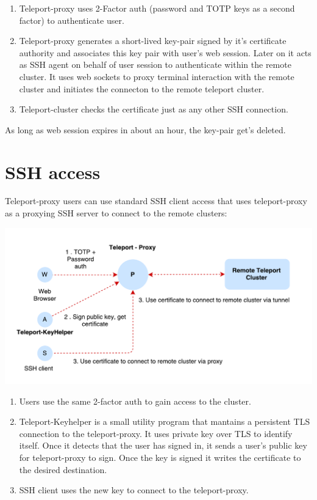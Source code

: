 \documentclass{res}
\begin{document}
\begin{resume}
    \begin{enumerate} %
      \item Teleport-proxy uses 2-Factor auth (password and TOTP keys as a second factor) to authenticate user.
      \item Teleport-proxy generates a short-lived key-pair signed by it's certificate authority and associates this key pair with user's web session. Later on it acts as SSH agent on behalf of user session to authenticate within the remote cluster. It uses web sockets to proxy terminal interaction with the remote cluster and initiates the connecton to the remote teleport cluster.
      \item Teleport-cluster checks the certificate just as any other SSH connection.
    \end{enumerate}

    As long as web session expires in about an hour, the key-pair get's deleted.

\section{SSH access}
\vspace{0.1in}

    Teleport-proxy users can use standard SSH client access that uses teleport-proxy as a proxying SSH server to connect to the remote clusters:
 
    \includegraphics[scale=0.8]{./images/teleport-ssh.pdf}

    \begin{enumerate} %
      \item Users use the same 2-factor auth to gain access to the cluster. 
      \item Teleport-Keyhelper is a small utility program that mantains a persistent TLS connection to the teleport-proxy. It uses private key over TLS to identify itself. Once it detects that the user has signed in, it sends a user's public key for teleport-proxy to sign. Once the key is signed it writes the certificate to the desired destination.
      \item SSH client uses the new key to connect to the teleport-proxy.
    \end{enumerate}


\end{resume}
\end{document}
